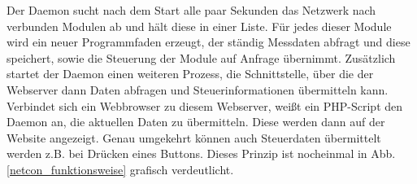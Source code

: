 \documentclass[a4paper,14pt,headsepline]{scrartcl}
\begin{document}
Der Daemon sucht nach dem Start alle paar Sekunden das Netzwerk nach verbunden Modulen ab und hält diese in einer Liste. Für jedes dieser Module wird ein neuer Programmfaden erzeugt, der ständig Messdaten abfragt und diese speichert, sowie die Steuerung der Module auf Anfrage übernimmt. Zusätzlich startet der Daemon einen weiteren Prozess, die Schnittstelle, über die der Webserver dann Daten abfragen und Steuerinformationen übermitteln kann. Verbindet sich ein Webbrowser zu diesem Webserver, weißt ein PHP-Script den Daemon an, die aktuellen Daten zu übermitteln. Diese werden dann auf der Website angezeigt. Genau umgekehrt können auch Steuerdaten übermittelt werden z.B. bei Drücken eines Buttons. Dieses Prinzip ist nocheinmal in Abb. \ref{netcon_funktionsweise} grafisch verdeutlicht.

\newpage

\begin{figure}[h]
\begin{center}
\end{center}
\end{figure}
\end{document}
